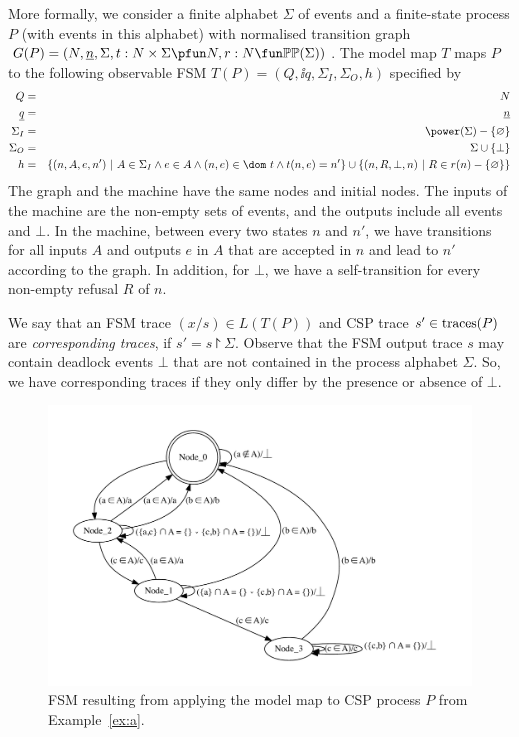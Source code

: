 More formally, we consider a finite alphabet $\Sigma$ of events and
a finite-state process $P$ (with events in this alphabet) with normalised
transition graph $G(P)=( N, \ii n, \Sigma, t : N\times\Sigma \pfun N, r : N
\fun \mathbb{P}\mathbb{P}(\Sigma))$. The model map $T$ maps $P$ to the
following observable FSM $T(P) = (Q,\ii q, \Sigma_I,\Sigma_O,h)$ specified by
%
\begin{eqnarray*}
  Q & = & N
  \\
  \ii q & = & \ii n
  \\
  \Sigma_I & = & \power(\Sigma) - \{ \varnothing \}
  \\
  \Sigma_O & = & \Sigma \cup \{ \bot\}
  \\
  h & = & \{ (n,A,e,n')~|~A\in \Sigma_I \wedge e\in A \wedge (n,e)\in \dom~t\wedge t(n,e) = n' \} \cup
  \{ (n,R,\bot,n)~|~R\in r(n) -\{\varnothing\} \}
\end{eqnarray*}
%
The graph and the machine have the same nodes and initial nodes. The inputs
of the machine are the non-empty sets of events, and the outputs include all
events and $\bot$. In the machine, between every two states $n$ and $n'$, we
have transitions for all inputs $A$ and outputs $e$ in $A$ that are accepted
in $n$ and lead to $n'$ according to the graph. In addition, for $\bot$, we
have a self-transition for every non-empty refusal $R$ of $n$.

We say that an FSM trace $(x/s) \in L(T(P))$ and CSP trace $s'\in\text{traces}(P)$ are
\emph{corresponding traces}, if $s' = s\project \Sigma$. Observe that the FSM
output trace $s$ may contain deadlock events $\bot$ that are not contained in
the  process alphabet $\Sigma$. So, we have corresponding traces if they only
differ by the presence or absence of $\bot$.

 \begin{figure}
 \begin{center}
\includegraphics[width=\textwidth]{fsm0.pdf}
\end{center}
\caption{FSM resulting from applying the model map to CSP process $P$ from Example~\ref{ex:a}.}
 \label{fig:fsm0}
 \end{figure}


